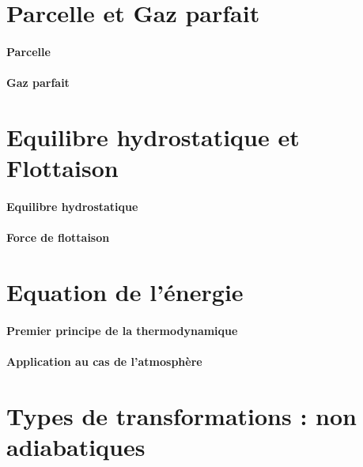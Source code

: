 \documentclass[a4paper,DIV16,10pt]{scrartcl}
\begin{document}
\begin{detail}
\newpage
\section{Parcelle et Gaz parfait}
	\paragraph{Parcelle}
		
		
	\paragraph{Gaz parfait}
		

\newpage
\section{Equilibre hydrostatique et Flottaison}
	\paragraph{Equilibre hydrostatique}
		
	\paragraph{Force de flottaison}
		

\newpage
\section{Equation de l'énergie}
	\paragraph{Premier principe de la thermodynamique}
		
	\paragraph{Application au cas de l'atmosphère}
		
\end{detail}

\newpage
\section{Types de transformations : non adiabatiques}

\end{document}
